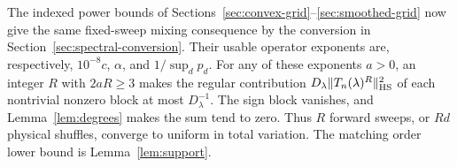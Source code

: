 The indexed power bounds of Sections~\ref{sec:convex-grid}--\ref{sec:smoothed-grid}
now give the same fixed-sweep mixing consequence by the conversion in
Section~\ref{sec:spectral-conversion}. Their usable operator exponents
are, respectively, $10^{-8}c$, $\alpha$, and $1/\sup_dp_d$.
For any of these exponents $a>0$, an integer $R$ with $2aR\ge3$
makes the regular contribution
$D_\lambda\|T_n(\lambda)^R\|_{\mathrm{HS}}^2$ of each nontrivial
nonzero block at most $D_\lambda^{-1}$. The sign block vanishes,
and Lemma~\ref{lem:degrees} makes the sum tend to zero. Thus $R$
forward sweeps, or $Rd$ physical shuffles, converge to uniform in
total variation. The matching order lower bound is
Lemma~\ref{lem:support}.
